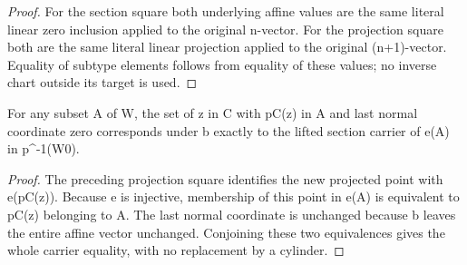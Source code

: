 \begin{proof}
For the section square both underlying affine values are the same literal
linear zero inclusion applied to the original n-vector. For the projection
square both are the same literal linear projection applied to the original
(n+1)-vector. Equality of subtype elements follows from equality of these
values; no inverse chart outside its target is used.
\end{proof}
\begin{lemma}
\label{hir:actual-nested-section-coordinate-carrier}
\leanok
{}
For any subset A of W, the set of z in C with pC(z) in A and last normal
coordinate zero corresponds under b exactly to the lifted section carrier
of e(A) in p^{-1}(W0).
\end{lemma}
\begin{proof}
The preceding projection square identifies the new projected point with e(pC(z)).
Because e is injective, membership of this point in e(A) is equivalent to
pC(z) belonging to A. The last normal coordinate is unchanged because b
leaves the entire affine vector unchanged. Conjoining these two equivalences
gives the whole carrier equality, with no replacement by a cylinder.
\end{proof}
